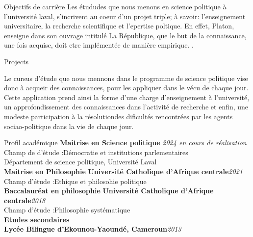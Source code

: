 \documentclass{resume} %
\begin{document}

\begin{rSection}{Objectifs de carrière}
{
Les étududes que nous menons en science politique à l'université laval, s'incrivent au coeur d'un projet triple; à savoir: l'enseignement universitaire, la recherche scientifique et l'epertise poltique.
En effet, Platon, enseigne dans son ouvrage intitulé La République, que le but de la connaissance, une fois acquise, doit etre implémentée de manière empirique. .
}
\end{rSection}
\begin{rSection}{Projects}
{
Le cursus d'étude que nous mennons dans le programme de science politique vise donc à acqueir des connaissances, pour les appliquer dans le vécu de chaque jour. Cette application prend ainsi la forme d'une charge d'enseignement à l'université, un approfondissement des connaissances dans l'activité de recherche et enfin, une modeste participation à la résolutiondes dificultés rencontrées par les agents sociao-politique dans la vie de chaque jour.

}

\end{rSection}
\begin{rSection}{Profil académique}
{\bf Maitrise en Science politique } \hfill {\em 2024
en cours de réalisation 
} 
\\ Champ de d'étude :Démocratie et institutions parlementaires\hfill { }
\\ Département de science politique, Université Laval
\\
{\bf Maitrise en Philosophie }
{\bf Université Catholique d'Afrique centrale}\hfill {\em 2021} 
\\Champ d'étude :Ethique et philosohie politique\hfill{}
\\
{\bf Baccalauréat en philosophie }
{\bf Université Catholique d'Afrique centrale}\hfill {\em 2018} 
\\Champ d'étude :Philosophie systématique\hfill{}
\\
{\bf Etudes secondaires }
\\
{\bf Lycée Bilingue d'Ekounou-Yaoundé, Cameroun}\hfill {\em 2013} 
\\\hfill{}
\end{rSection}
\end{document}
